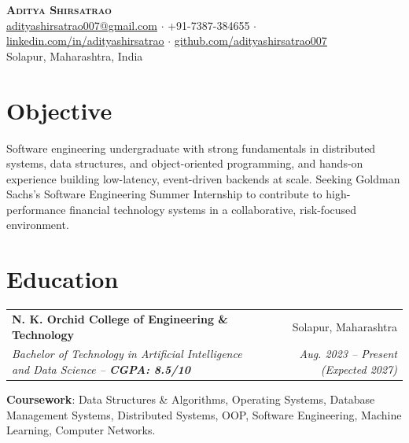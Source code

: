 \documentclass[letterpaper,11pt]{article}
\makeatletter
\newcommand{\resumeSubheading}[4]{
  \vspace{-2pt}\item
    \begin{tabular*}{0.97\textwidth}[t]{l@{\extracolsep{\fill}}r}
      \textbf{#1} & #2 \\
      \textit{\small#3} & \textit{\small #4} \\
    \end{tabular*}\vspace{-7pt}
}
\newcommand{\resumeSubHeadingListStart}{\begin{itemize}[leftmargin=0.15in, label={}]}
\newcommand{\resumeSubHeadingListEnd}{\end{itemize}}
\makeatother
\begin{document}
\begin{center}
    \textbf{\Huge \scshape Aditya Shirsatrao} \\ \vspace{3pt}
    \small
    \href{mailto:adityashirsatrao007@gmail.com}{\underline{adityashirsatrao007@gmail.com}} $\cdot$
    +91-7387-384655 $\cdot$
    \href{https://www.linkedin.com/in/adityashirsatrao}{\underline{linkedin.com/in/adityashirsatrao}} $\cdot$
    \href{https://github.com/adityashirsatrao007}{\underline{github.com/adityashirsatrao007}} \\
    \small Solapur, Maharashtra, India
\end{center}

\section{Objective}
  \small{Software engineering undergraduate with strong fundamentals in distributed systems, data structures, and object-oriented programming, and hands-on experience building low-latency, event-driven backends at scale. Seeking Goldman Sachs's Software Engineering Summer Internship to contribute to high-performance financial technology systems in a collaborative, risk-focused environment.}

\section{Education}
  \resumeSubHeadingListStart
    \resumeSubheading
      {N. K. Orchid College of Engineering \& Technology}{Solapur, Maharashtra}
      {Bachelor of Technology in Artificial Intelligence and Data Science -- \textbf{CGPA: 8.5/10}}{Aug. 2023 -- Present (Expected 2027)}
      \vspace{2pt}
      \small{\item{
       \textbf{Coursework}: Data Structures \& Algorithms, Operating Systems, Database Management Systems, Distributed Systems, OOP, Software Engineering, Machine Learning, Computer Networks.
      }}
  \resumeSubHeadingListEnd

\end{document}
